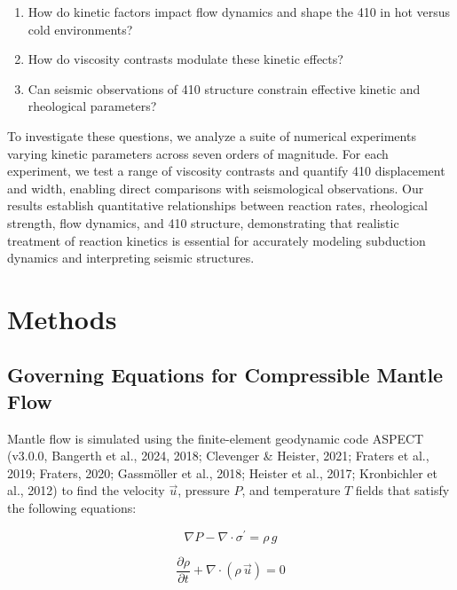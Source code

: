\documentclass[draft,linenumbers]{agujournal2019}
\providecommand{\tightlist}{\setlength{\itemsep}{0pt}\setlength{\parskip}{0pt}}
\begin{document}
\begin{enumerate}
\def\labelenumi{\arabic{enumi}.}
\tightlist
\item
  How do kinetic factors impact flow dynamics and shape the 410 in hot
  versus cold environments?
\item
  How do viscosity contrasts modulate these kinetic effects?
\item
  Can seismic observations of 410 structure constrain effective kinetic
  and rheological parameters?
\end{enumerate}

To investigate these questions, we analyze a suite of numerical
experiments varying kinetic parameters across seven orders of magnitude.
For each experiment, we test a range of viscosity contrasts and quantify
410 displacement and width, enabling direct comparisons with
seismological observations. Our results establish quantitative
relationships between reaction rates, rheological strength, flow
dynamics, and 410 structure, demonstrating that realistic treatment of
reaction kinetics is essential for accurately modeling subduction
dynamics and interpreting seismic structures.

\section{Methods}\label{sec:methods}

\subsection{Governing Equations for Compressible Mantle
Flow}\label{sec:governing-equations}

Mantle flow is simulated using the finite-element geodynamic code ASPECT
(v3.0.0, Bangerth et al., 2024, 2018; Clevenger \& Heister, 2021;
{Fraters et al.}, 2019; Fraters, 2020; Gassmöller et al., 2018; Heister
et al., 2017; Kronbichler et al., 2012) to find the velocity
\(\vec{u}\), pressure \(P\), and temperature \(T\) fields that satisfy
the following equations:

\begin{equation}
  \nabla P - \nabla \cdot \sigma^{\prime} = \rho\, g
  \label{eq:navier-stokes-no-inertia}
\end{equation}

\begin{equation}
  \frac{\partial \rho}{\partial t} + \nabla \cdot (\rho\, \vec{u}) = 0
  \label{eq:continuity-compressible}
\end{equation}
\end{document}
